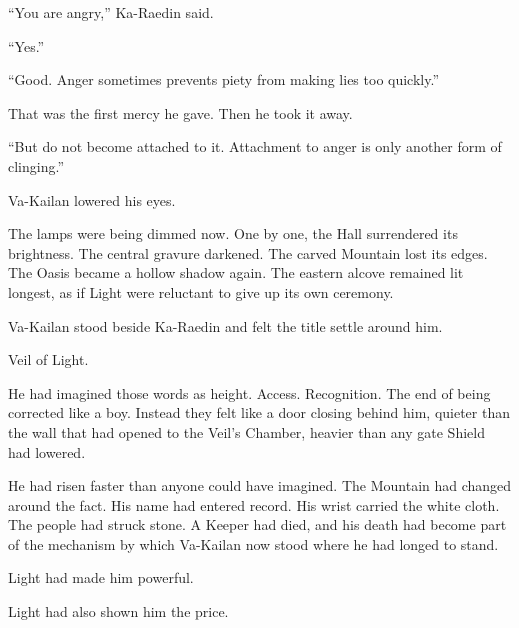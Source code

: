 “You are angry,” Ka-Raedin said.\par

“Yes.”\par

“Good. Anger sometimes prevents piety from making lies too quickly.”\par

That was the first mercy he gave. Then he took it away.\par

“But do not become attached to it. Attachment to anger is only another form of clinging.”\par

Va-Kailan lowered his eyes.\par

The lamps were being dimmed now. One by one, the Hall surrendered its brightness. The central gravure darkened. The carved Mountain lost its edges. The Oasis became a hollow shadow again. The eastern alcove remained lit longest, as if Light were reluctant to give up its own ceremony.\par

Va-Kailan stood beside Ka-Raedin and felt the title settle around him.\par

Veil of Light.\par

He had imagined those words as height. Access. Recognition. The end of being corrected like a boy. Instead they felt like a door closing behind him, quieter than the wall that had opened to the Veil’s Chamber, heavier than any gate Shield had lowered.\par

He had risen faster than anyone could have imagined. The Mountain had changed around the fact. His name had entered record. His wrist carried the white cloth. The people had struck stone. A Keeper had died, and his death had become part of the mechanism by which Va-Kailan now stood where he had longed to stand.\par

Light had made him powerful.\par

Light had also shown him the price.\par

\ornament